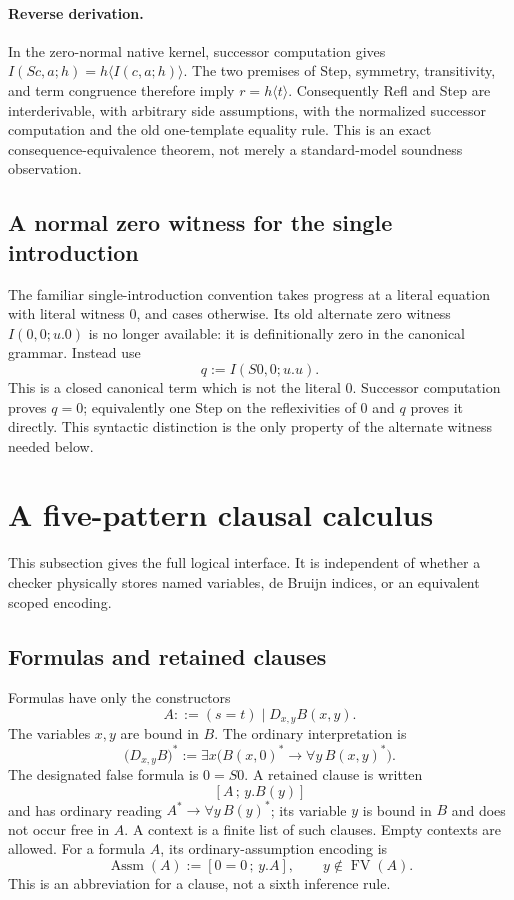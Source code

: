 \paragraph{Reverse derivation.}
In the zero-normal native kernel, successor computation gives
$I(Sc,a;h)=h\langle I(c,a;h)\rangle$. The two premises of Step,
symmetry, transitivity, and term congruence therefore imply
$r=h\langle t\rangle$. Consequently Refl and Step are interderivable,
with arbitrary side assumptions, with the normalized successor
computation and the old one-template equality rule. This is an exact
consequence-equivalence theorem, not merely a standard-model soundness
observation.

\subsection{A normal zero witness for the single introduction}

The familiar single-introduction convention takes progress at a literal
equation with literal witness $0$, and cases otherwise. Its old alternate
zero witness $I(0,0;u.0)$ is no longer available: it is definitionally
zero in the canonical grammar. Instead use
\[
 q:=I(S0,0;u.u).
\]
This is a closed canonical term which is not the literal $0$.
Successor computation proves $q=0$; equivalently one Step on the
reflexivities of $0$ and $q$ proves it directly. This syntactic distinction
is the only property of the alternate witness needed below.

\section{A five-pattern clausal calculus}
\label{sec:five-pattern-clauses}

This subsection gives the full logical interface. It is independent of
whether a checker physically stores named variables, de Bruijn indices,
or an equivalent scoped encoding.

\subsection{Formulas and retained clauses}

Formulas have only the constructors
\[
 A ::= (s=t)\mid D_{x,y}B(x,y).
\]
The variables $x,y$ are bound in $B$. The ordinary interpretation is
\[
 \bigl(D_{x,y}B\bigr)^*
 :=\exists x\bigl(B(x,0)^*\to\forall y\,B(x,y)^*\bigr).
\]
The designated false formula is $0=S0$.
A retained clause is written
\[
 [A\,;\,y.B(y)]
\]
and has ordinary reading $A^*\to\forall y\,B(y)^*$; its variable $y$
is bound in $B$ and does not occur free in $A$. A context is a finite
list of such clauses. Empty contexts are allowed. For a formula $A$,
its ordinary-assumption encoding is
\[
 \operatorname{Assm}(A):=[0=0\,;\,y.A],\qquad y\notin\operatorname{FV}(A).
\]
This is an abbreviation for a clause, not a sixth inference rule.

